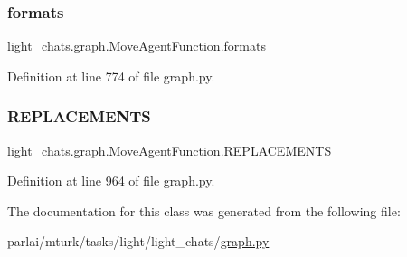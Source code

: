 \subsubsection{\texorpdfstring{formats}{formats}}
{\footnotesize\ttfamily light\+\_\+chats.\+graph.\+Move\+Agent\+Function.\+formats}



Definition at line 774 of file graph.\+py.

\mbox{\label{classlight__chats_1_1graph_1_1MoveAgentFunction_a7757c7aebcb3df4202c8aebdea0746cf}} 
\subsubsection{\texorpdfstring{R\+E\+P\+L\+A\+C\+E\+M\+E\+N\+TS}{REPLACEMENTS}}
{\footnotesize\ttfamily light\+\_\+chats.\+graph.\+Move\+Agent\+Function.\+R\+E\+P\+L\+A\+C\+E\+M\+E\+N\+TS\hspace{0.3cm}{\ttfamily [static]}}



Definition at line 964 of file graph.\+py.



The documentation for this class was generated from the following file\+:\begin{DoxyCompactItemize}
\item 
parlai/mturk/tasks/light/light\+\_\+chats/\hyperlink{parlai_2mturk_2tasks_2light_2light__chats_2graph_8py}{graph.\+py}\end{DoxyCompactItemize}
